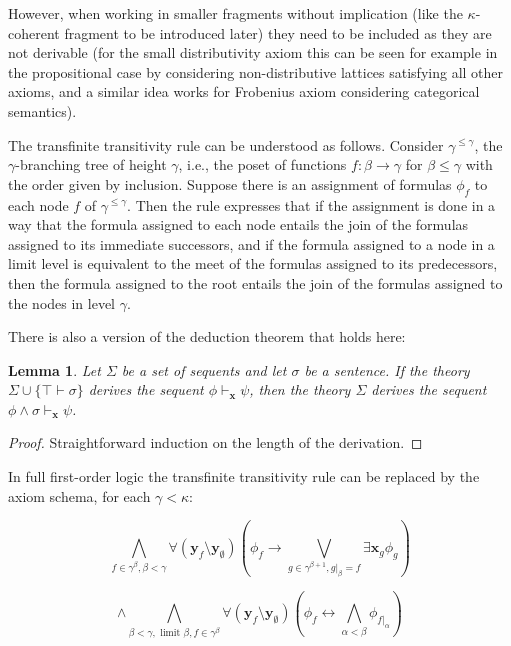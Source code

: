 \documentclass[a4paper,11pt]{article}
\theoremstyle{plain}
\newtheorem{lemma}[thm]{Lemma}
\theoremstyle{plain}
\theoremstyle{remark}
\begin{document}
However, when working in smaller fragments without implication (like the $\kappa$-coherent fragment to be introduced later) they need to be included as they are  not derivable (for the small distributivity axiom this can be seen for example in the propositional case by considering non-distributive lattices satisfying all other axioms, and a similar idea works for Frobenius axiom considering categorical semantics).

The transfinite transitivity rule can be understood as follows. Consider $\gamma^{\leq \gamma}$, the $\gamma$-branching tree of height $\gamma$, i.e., the poset of functions $f: \beta \to \gamma$ for $\beta \leq \gamma$ with the order given by inclusion. Suppose there is an assignment of formulas $\phi_f$ to each node $f$ of $\gamma^{\leq \gamma}$. Then the rule expresses that if the assignment is done in a way that the formula assigned to each node entails the join of the formulas assigned to its immediate successors, and if the formula assigned to a node in a limit level is equivalent to the meet of the formulas assigned to its predecessors, then the formula assigned to the root entails the join of the formulas assigned to the nodes in level $\gamma$. 

There is also a version of the deduction theorem that holds here:

\begin{lemma}\label{dt}
 Let $\Sigma$ be a set of sequents and let $\sigma$ be a sentence. If the theory $\Sigma \cup \{\top \vdash \sigma\}$ derives the sequent $\phi \vdash_{\mathbf{x}} \psi$, then the theory $\Sigma$ derives the sequent $\phi \wedge \sigma \vdash_{\mathbf{x}} \psi$.
\end{lemma}

\begin{proof}
 Straightforward induction on the length of the derivation.
\end{proof}

In full first-order logic the transfinite transitivity rule can be replaced by the axiom schema, for each $\gamma < \kappa$:

$$\bigwedge_{f \in \gamma^{\beta}, \beta<\gamma} \forall (\mathbf{y}_{f} \setminus \mathbf{y}_{\emptyset}) \left(\phi_{f} \to \bigvee_{g \in \gamma^{\beta+1}, g|_{\beta}=f} \exists \mathbf{x}_{g} \phi_{g}\right)$$

$$\wedge \bigwedge_{\beta < \gamma, \text{ limit }\beta, f \in \gamma^{\beta}} \forall (\mathbf{y}_{f} \setminus \mathbf{y}_{\emptyset}) \left(\phi_{f} \leftrightarrow \bigwedge_{\alpha<\beta}\phi_{f|_{\alpha}}\right)$$
\end{document}
